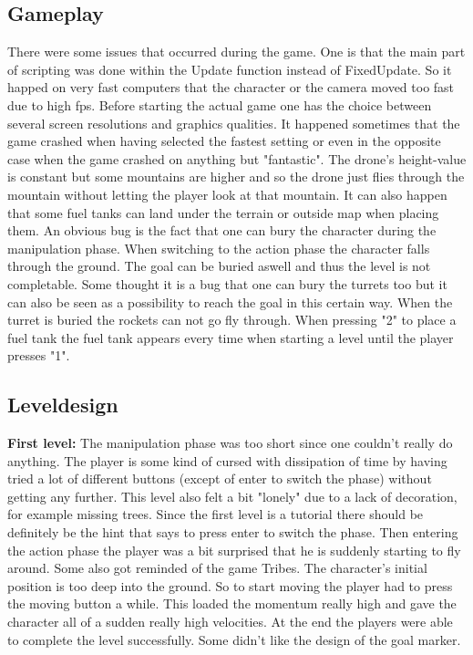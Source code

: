 \documentclass[12pt, letterpaper]{scrartcl}
\begin{document}
	 \subsection{Gameplay}
	 There were some issues that occurred during the game.
	 One is that the main part of scripting was done within the Update function instead of FixedUpdate. So it happed on very fast computers that the character or the camera moved too fast due to high fps.
	 Before starting the actual game one has the choice between several screen resolutions and graphics qualities. It happened sometimes that the game crashed when having selected the fastest setting or even in the opposite case when the game crashed on anything but "fantastic".
	 The drone's height-value is constant but some mountains are higher and so the drone just flies through the mountain without letting the player look at that mountain. It can also happen that some fuel tanks can land under the terrain or outside map when placing them.
	 An obvious bug is the fact that one can bury the character during the manipulation phase. When switching to the action phase the character falls through the ground. The goal can be buried aswell and thus the level is not completable. Some thought it is a bug that one can bury the turrets too but it can also be seen as a possibility to reach the goal in this certain way. When the turret is buried the rockets can not go fly through. When pressing "2" to place a fuel tank the fuel tank appears every time when starting a level until the player presses "1".
	 
	 \subsection{Leveldesign}
	 \textbf{First level:}
	 The manipulation phase was too short since one couldn't really do anything. The player is some kind of cursed with dissipation of time by having tried a lot of different buttons (except of enter to switch the phase) without getting any further. This level also felt a bit "lonely" due to a lack of decoration, for example missing trees. Since the first level is a tutorial there should be definitely be the hint that says to press enter to switch the phase.
	 Then entering the action phase the player was a bit surprised that he is suddenly starting to fly around. Some also got reminded of the game Tribes.
	 The character's initial position is too deep into the ground. So to start moving the player had to press the moving button a while. This loaded the momentum really high and gave the character all of a sudden really high velocities.
	 At the end the players were able to complete the level successfully. Some didn't like the design of the goal marker.
	 
\end{document}
